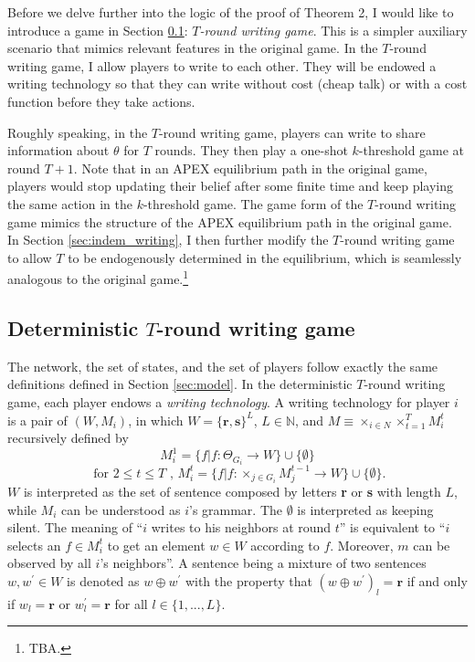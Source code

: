 \documentclass[12pt,letter]{article}
\theoremstyle{definition}
\theoremstyle{remark}
\theoremstyle{claim}
\begin{document}
Before we delve further into the logic of the proof of Theorem 2, I would like to introduce a game in Section \ref{sec:writing}: \textit{$T$-round writing game}. This is a simpler auxiliary scenario that mimics relevant features in the original game. In the $T$-round writing game, I allow players to write to each other. They will be endowed a writing technology so that they can write without cost (cheap talk) or with a cost function before they take actions. 
 

Roughly speaking, in the $T$-round writing game, players can write to share information about $\theta$ for $T$ rounds. They then play a one-shot $k$-threshold game at round $T+1$. Note that in an APEX equilibrium path in the original game, players would stop updating their belief after some finite time and keep playing the same action in the $k$-threshold game. The game form of the $T$-round writing game mimics the structure of the APEX equilibrium path in the original game. In Section \ref{sec:indem_writing}, I then further modify the $T$-round writing game to allow $T$ to be endogenously determined in the equilibrium, which is seamlessly analogous to the original game.\footnote{TBA.}  

  

\subsection{Deterministic $T$-round writing game}
\label{sec:writing}
The network, the set of states, and the set of players follow exactly the same definitions defined in Section \ref{sec:model}. In the deterministic $T$-round writing game, each player endows a \textit{writing technology}. A writing technology for player $i$ is a pair of $(W,M_i)$, in which $W=\{{\textbf{r}},\textbf{s}\}^L$, $L\in \mathbb{N}$, and $M\equiv \times_{i\in N}\times^T_{t=1}M^{t}_i$ recursively defined by
\[M^1_i=\{f|f:\Theta_{G_i}\rightarrow W\}\cup \{\emptyset\}\]
\[ \text{ for } 2\leq t \leq T\text{ , }M^{t}_i=\{f|f:\times_{j\in G_i}M^{t-1}_j\rightarrow W\}\cup \{\emptyset\}. \]
$W$ is interpreted as the set of sentence composed by letters \textbf{r} or \textbf{s} with length $L$, while $M_i$ can be understood as $i$'s grammar. The $\emptyset$ is interpreted as keeping silent. The meaning of ``$i$ writes to his neighbors at round $t$'' is equivalent to ``$i$ selects an $f\in M^t_i$ to get an element $w\in W$ according to $f$.  Moreover, $m$ can be observed by all $i$'s neighbors''. A sentence being a mixture of two sentences $w,w^{'}\in W$ is denoted as $w\oplus w^{'}$ with the property that $(w\oplus w^{'})_l=\textbf{r}$ if and only if $w_l=\textbf{r}$ or $w^{'}_l=\textbf{r}$ for all $l\in \{1,...,L\}$. 
\end{document}
